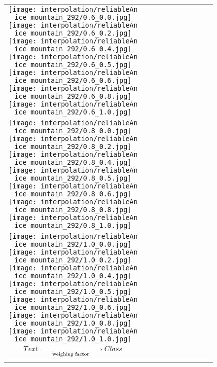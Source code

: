 \documentclass[10pt,twocolumn,letterpaper]{article}
\begin{document}
\begin{figure*}[tb!]
{\begin{tabular}{c c c c c c c c c c}
\tabularnewline
    \raisebox{0.1in}{\rotatebox{90}{\small \emph{$0.6$}
 }}
  \texttt{[image: interpolation/reliableAn ice mountain\_292/0.6\_0.0.jpg]}
  \texttt{[image: interpolation/reliableAn ice mountain\_292/0.6\_0.2.jpg]}
  \texttt{[image: interpolation/reliableAn ice mountain\_292/0.6\_0.4.jpg]}
  \texttt{[image: interpolation/reliableAn ice mountain\_292/0.6\_0.5.jpg]}
  \texttt{[image: interpolation/reliableAn ice mountain\_292/0.6\_0.6.jpg]}
  \texttt{[image: interpolation/reliableAn ice mountain\_292/0.6\_0.8.jpg]}
  \texttt{[image: interpolation/reliableAn ice mountain\_292/0.6\_1.0.jpg]}
\tabularnewline
    \raisebox{0.1in}{\rotatebox{90}{\small \emph{$0.8$}
 }}
  \texttt{[image: interpolation/reliableAn ice mountain\_292/0.8\_0.0.jpg]}
  \texttt{[image: interpolation/reliableAn ice mountain\_292/0.8\_0.2.jpg]}
   \texttt{[image: interpolation/reliableAn ice mountain\_292/0.8\_0.4.jpg]}
  \texttt{[image: interpolation/reliableAn ice mountain\_292/0.8\_0.5.jpg]}
  \texttt{[image: interpolation/reliableAn ice mountain\_292/0.8\_0.6.jpg]}
  \texttt{[image: interpolation/reliableAn ice mountain\_292/0.8\_0.8.jpg]}
  \texttt{[image: interpolation/reliableAn ice mountain\_292/0.8\_1.0.jpg]}
\tabularnewline
    \raisebox{0.1in}{\rotatebox{90}{\small \emph{$1.0$}
 }}
  \texttt{[image: interpolation/reliableAn ice mountain\_292/1.0\_0.0.jpg]}
  \texttt{[image: interpolation/reliableAn ice mountain\_292/1.0\_0.2.jpg]}
   \texttt{[image: interpolation/reliableAn ice mountain\_292/1.0\_0.4.jpg]}
  \texttt{[image: interpolation/reliableAn ice mountain\_292/1.0\_0.5.jpg]}
  \texttt{[image: interpolation/reliableAn ice mountain\_292/1.0\_0.6.jpg]}
  \texttt{[image: interpolation/reliableAn ice mountain\_292/1.0\_0.8.jpg]}
  \texttt{[image: interpolation/reliableAn ice mountain\_292/1.0\_1.0.jpg]}
    \tabularnewline
        \raisebox{0.1in}{\rotatebox{90}{
 }}
 \hspace{0.5mm}
$\scriptsize{Text}\xrightarrow[\text{weighing factor}]{\hspace*{3cm}}\scriptsize{Class}$
  \tabularnewline
\vspace{2mm}
\vspace{-2\baselineskip}

\end{tabular}}
\end{figure*}
\end{document}
